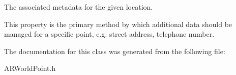 The associated metadata for the given location. 

This property is the primary method by which additional data should be managed for a specific point, e.\-g. street address, telephone number. 

The documentation for this class was generated from the following file\-:\begin{DoxyCompactItemize}
\item 
A\-R\-World\-Point.\-h\end{DoxyCompactItemize}

